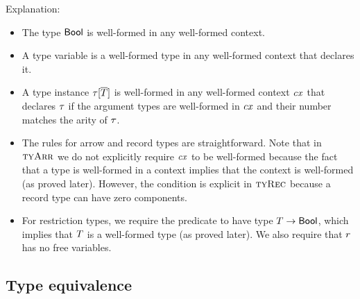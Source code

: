 Explanation:
\begin{itemize}
\item
The type $\mathsf{Bool}$ is well-formed in any well-formed context.
\item
A type variable is a well-formed type in any well-formed context that declares
it.
\item
A type instance $\tau[\overline{T}]$ is well-formed in any well-formed context $\mathit{cx}$ that
declares $\tau$ if the argument types are well-formed in $\mathit{cx}$ and their
number matches the arity of $\tau$.
\item
The rules for arrow and record types are straightforward. Note that in
$\textsc{tyArr}$ we do not explicitly require $\mathit{cx}$ to be well-formed because the fact
that a type is well-formed in a context implies that the context is
well-formed (as proved later). However, the condition is explicit in $\textsc{tyRec}$
because a record type can have zero components.
\item
For restriction types, we require the predicate to have type
$T\to\mathsf{Bool}$, which implies that $T$ is a well-formed type (as
proved later). We also require that $r$ has no free variables.
\end{itemize}

\subsection{Type equivalence}


